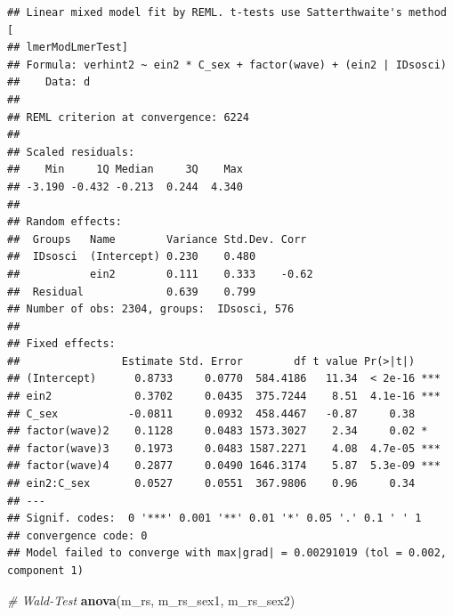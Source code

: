 \documentclass[
]{book}
\newenvironment{Shaded}{\begin{snugshade}}{\end{snugshade}}
\newcommand{\CommentTok}[1]{\textcolor[rgb]{0.56,0.35,0.01}{\textit{#1}}}
\newcommand{\DataTypeTok}[1]{\textcolor[rgb]{0.13,0.29,0.53}{#1}}
\newcommand{\KeywordTok}[1]{\textcolor[rgb]{0.13,0.29,0.53}{\textbf{#1}}}
\newcommand{\NormalTok}[1]{#1}
\newcommand{\OperatorTok}[1]{\textcolor[rgb]{0.81,0.36,0.00}{\textbf{#1}}}
\newcommand{\OtherTok}[1]{\textcolor[rgb]{0.56,0.35,0.01}{#1}}
\newcommand{\StringTok}[1]{\textcolor[rgb]{0.31,0.60,0.02}{#1}}
\begin{document}
\begin{Shaded}
\end{Shaded}

\begin{verbatim}
## Linear mixed model fit by REML. t-tests use Satterthwaite's method [
## lmerModLmerTest]
## Formula: verhint2 ~ ein2 * C_sex + factor(wave) + (ein2 | IDsosci)
##    Data: d
## 
## REML criterion at convergence: 6224
## 
## Scaled residuals: 
##    Min     1Q Median     3Q    Max 
## -3.190 -0.432 -0.213  0.244  4.340 
## 
## Random effects:
##  Groups   Name        Variance Std.Dev. Corr 
##  IDsosci  (Intercept) 0.230    0.480         
##           ein2        0.111    0.333    -0.62
##  Residual             0.639    0.799         
## Number of obs: 2304, groups:  IDsosci, 576
## 
## Fixed effects:
##                Estimate Std. Error        df t value Pr(>|t|)    
## (Intercept)      0.8733     0.0770  584.4186   11.34  < 2e-16 ***
## ein2             0.3702     0.0435  375.7244    8.51  4.1e-16 ***
## C_sex           -0.0811     0.0932  458.4467   -0.87     0.38    
## factor(wave)2    0.1128     0.0483 1573.3027    2.34     0.02 *  
## factor(wave)3    0.1973     0.0483 1587.2271    4.08  4.7e-05 ***
## factor(wave)4    0.2877     0.0490 1646.3174    5.87  5.3e-09 ***
## ein2:C_sex       0.0527     0.0551  367.9806    0.96     0.34    
## ---
## Signif. codes:  0 '***' 0.001 '**' 0.01 '*' 0.05 '.' 0.1 ' ' 1
## convergence code: 0
## Model failed to converge with max|grad| = 0.00291019 (tol = 0.002, component 1)
\end{verbatim}

\begin{Shaded}
\begin{Highlighting}[]
\CommentTok{# Wald-Test}
\KeywordTok{anova}\NormalTok{(m_rs, m_rs_sex1, m_rs_sex2)}
\end{Highlighting}
\end{Shaded}
\end{document}
